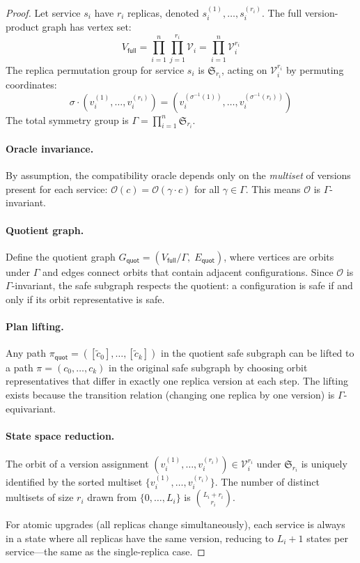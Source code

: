 \documentclass[10pt,twocolumn]{article}
\begin{document}
\begin{proof}
Let service $s_i$ have $r_i$ replicas, denoted
$s_i^{(1)}, \ldots, s_i^{(r_i)}$. The full version-product
graph has vertex set:
\[
  V_{\mathsf{full}} = \prod_{i=1}^{n} \prod_{j=1}^{r_i}
  \mathcal{V}_i = \prod_{i=1}^{n} \mathcal{V}_i^{r_i}
\]
The replica permutation group for service $s_i$ is
$\mathfrak{S}_{r_i}$, acting on $\mathcal{V}_i^{r_i}$ by
permuting coordinates:
\[
  \sigma \cdot (v_i^{(1)}, \ldots, v_i^{(r_i)}) =
  (v_i^{(\sigma^{-1}(1))}, \ldots, v_i^{(\sigma^{-1}(r_i))})
\]
The total symmetry group is
$\Gamma = \prod_{i=1}^{n} \mathfrak{S}_{r_i}$.

\paragraph{Oracle invariance.}
By assumption, the compatibility oracle depends only on the
\emph{multiset} of versions present for each service:
$\mathcal{O}(c) = \mathcal{O}(\gamma \cdot c)$ for all
$\gamma \in \Gamma$. This means $\mathcal{O}$ is
$\Gamma$-invariant.

\paragraph{Quotient graph.}
Define the quotient graph $G_{\mathsf{quot}} =
(V_{\mathsf{full}} / \Gamma,\; E_{\mathsf{quot}})$, where
vertices are orbits under $\Gamma$ and edges connect orbits
that contain adjacent configurations. Since $\mathcal{O}$ is
$\Gamma$-invariant, the safe subgraph respects the quotient:
a configuration is safe if and only if its orbit representative
is safe.

\paragraph{Plan lifting.}
Any path $\pi_{\mathsf{quot}} = ([\tilde{c}_0], \ldots,
[\tilde{c}_k])$ in the quotient safe subgraph can be lifted
to a path $\pi = (c_0, \ldots, c_k)$ in the original safe
subgraph by choosing orbit representatives that differ in
exactly one replica version at each step. The lifting exists
because the transition relation (changing one replica by one
version) is $\Gamma$-equivariant.

\paragraph{State space reduction.}
The orbit of a version assignment $(v_i^{(1)}, \ldots,
v_i^{(r_i)}) \in \mathcal{V}_i^{r_i}$ under
$\mathfrak{S}_{r_i}$ is uniquely identified by the sorted
multiset $\{v_i^{(1)}, \ldots, v_i^{(r_i)}\}$. The number
of distinct multisets of size $r_i$ drawn from
$\{0, \ldots, L_i\}$ is $\binom{L_i + r_i}{r_i}$.

For atomic upgrades (all replicas change simultaneously), each
service is always in a state where all replicas have the same
version, reducing to $L_i + 1$ states per service---the same
as the single-replica case.
\end{proof}
\end{document}
